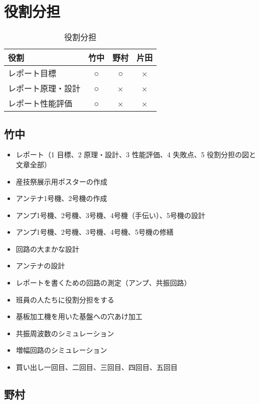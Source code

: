 \documentclass[report.tex]{subfiles}
\begin{document}
\section{役割分担}

\begin{table}[H]
	\centering
	\caption{役割分担}
	\label{tab:yakuwari}
	\begin{tabular}{lccc} \hline
		役割        & 竹中 & 野村 & 片田 \\ \hline
		レポート目標    & ○  & ○  & ×  \\
		レポート原理・設計 & ○  & ×  & ×  \\
		レポート性能評価  & ○  & ×  & ×  \\ \hline
	\end{tabular}
\end{table}

\subsection{竹中}

\begin{itemize}
	\item レポート（1 目標、2 原理・設計、3 性能評価、4 失敗点、5 役割分担の図と文章全部）
	\item 産技祭展示用ポスターの作成
	\item アンテナ1号機、2号機の作成
	\item アンプ1号機、2号機、3号機、4号機（手伝い）、5号機の設計
	\item アンプ1号機、2号機、3号機、4号機、5号機の修繕
	\item 回路の大まかな設計
	\item アンテナの設計
	\item レポートを書くための回路の測定（アンプ、共振回路）
	\item 班員の人たちに役割分担をする
	\item 基板加工機を用いた基盤への穴あけ加工
	\item 共振周波数のシミュレーション
	\item 増幅回路のシミュレーション
	\item 買い出し一回目、二回目、三回目、四回目、五回目
\end{itemize}

\subsection{野村}
\end{document}
